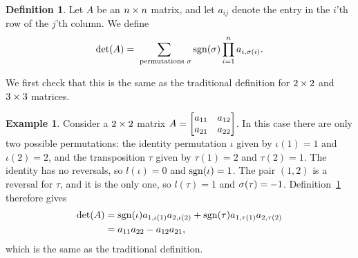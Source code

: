 \documentclass[reqno]{amsart}
\theoremstyle{definition}
\newtheorem{definition}[theorem]{Definition}
\newtheorem{example}[theorem]{Example}
\begin{document}
\begin{definition}\label{defn-det}
 Let $A$ be an $n\times n$ matrix, and let $a_{ij}$ denote the entry in
 the $i$'th row of the $j$'th column.  We define
 \[ \det(A) =
     \sum_{\text{ permutations } \sigma} \operatorname{sgn}(\sigma) \prod_{i=1}^n
     a_{i,\sigma(i)}.
 \]
\end{definition}

We first check that this is the same as the traditional definition for
$2\times 2$ and $3\times 3$ matrices.

\begin{example}\label{eg-det-two}
 Consider a $2\times 2$ matrix
 $A=\left[\begin{matrix} a_{11}&a_{12}\\ a_{21}&a_{22}\end{matrix}\right]$.  In this case there are
 only two possible permutations: the identity permutation $\iota$
 given by $\iota(1)=1$ and $\iota(2)=2$, and the transposition $\tau$
 given by $\tau(1)=2$ and $\tau(2)=1$.  The identity has no reversals,
 so $l(\iota)=0$ and $\operatorname{sgn}(\iota)=1$.  The pair $(1,2)$ is a reversal
 for $\tau$, and it is the only one, so $l(\tau)=1$ and
 $\sigma(\tau)=-1$.  Definition~\ref{defn-det} therefore gives
 \begin{align*}
  \det(A) &= \operatorname{sgn}(\iota)a_{1,\iota(1)}a_{2,\iota(2)} +
             \operatorname{sgn}(\tau) a_{1,\tau(1)}a_{2,\tau(2)} \\
          &= a_{11} a_{22} - a_{12}a_{21},
 \end{align*}
 which is the same as the traditional definition.
\end{example}
\end{document}
